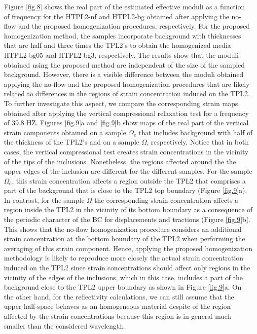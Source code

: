 \documentclass[draft]{agujournal2019}
\begin{document}
Figure \ref{fig.8} shows the real part of the estimated effective moduli as a function of frequency for the HTPL2-nf and HTPL2-bg obtained after applying the  no-flow  and  the proposed homogenization procedures, respectively. For the proposed homogenization method, the samples incorporate background with thicknesses that are half and three times the TPL2's to obtain the homogenized media HTPL2-bg05 and HTPL2-bg3, respectively. The results show that the moduli obtained using the proposed method are independent of the size of the sampled background. However, there is a visible difference between the moduli obtained applying the no-flow and the proposed homogenization procedures that are likely  related to differences in the regions of strain concentration induced on the TPL2. To further investigate this aspect, we compare the corresponding  strain maps obtained after applying the vertical compressional relaxation test for a frequency of 39.8 HZ. Figures \ref{fig.9}a and \ref{fig.9}b show maps of the real part of the vertical strain components obtained on a sample $\Omega_e$ that includes background with half of the thickness of the TPL2's and on a sample $\Omega$, respectively. Notice that in both cases, the vertical compressional test creates strain concentrations in the vicinity of the tips of the inclusions. Nonetheless, the regions affected around the the upper edges of the inclusion are different for the different samples. For the sample $\Omega_e$, this strain concentration affects a region outside the TPL2 that comprises a part of the background that is close to the TPL2 top boundary (Figure \ref{fig.9}a). In contrast, for the sample $\Omega$  the corresponding strain concentration affects a region inside the TPL2 in the vicinity of its bottom boundary as a consequence of the periodic character of the BC for displacements and tractions (Figure \ref{fig.9}b). This shows that the no-flow homogenization procedure considers an additional strain concentration at the bottom boundary of the TPL2 when performing the averaging of this strain component. Hence, applying the proposed homogenization methodology is likely to reproduce more closely the actual strain concentration induced on the TPL2 since strain concentrations should affect only regions in the vicinity of the edges of the inclusions, which in this case, includes a part of the background close to the TPL2 upper boundary as shown in Figure \ref{fig.9}a. On the other hand, for the reflectivity calculations, we can still assume that the upper half-space behaves as an homogeneous material despite of the region affected by the strain concentrations because this region is in general much smaller than the considered wavelength.
\end{document}
